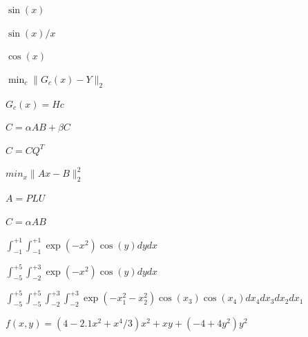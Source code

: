 \documentclass{article}
\begin{document}
$ \sin(x) $
\pagebreak

$ \sin(x) / x $
\pagebreak

$ \cos(x) $
\pagebreak

$ \min_c \| G_c(x) - Y \|_2 $
\pagebreak

$ G_c(x) = H c $
\pagebreak

$ C = \alpha A B + \beta C $
\pagebreak

$ C = C Q^T $
\pagebreak

$ min_x \| A x - B \|^2_2 $
\pagebreak

$ A = P L U $
\pagebreak

$ C = \alpha A B $
\pagebreak

$ \int_{-1}^{+1} \int_{-1}^{+1} \exp(-x^2) \cos(y) dy dx $
\pagebreak

$ \int_{-5}^{+5} \int_{-2}^{+3} \exp(-x^2) \cos(y) dy dx $
\pagebreak

$ \int_{-5}^{+5} \int_{-5}^{+5} \int_{-2}^{+3} \int_{-2}^{+3} \exp(-x_1^2 -x_2^2) \cos(x_3) \cos(x_4) dx_4 dx_3 dx_2 dx_1 $
\pagebreak

$ f(x,y) = ( 4 - 2.1 x^2 + x^4 / 3) x^2 + x y + ( - 4 + 4 y^2) y^2 $
\pagebreak
\end{document}
